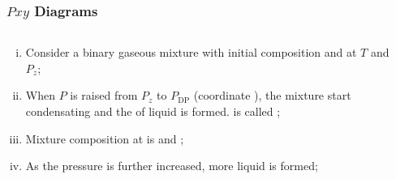 \documentclass[10pt,compress,unknownkeysallowed]{beamer}
\begin{document}
\begin{frame}
  \frametitle{$Pxy$ Diagrams}
  \begin{columns}
     \begin{column}[l]{0.5\linewidth}
       \begin{enumerate}[i)]
          \item<1-> Consider a binary gaseous mixture with initial composition \red{$\left[x_{1}=0; y_{1}=y_{z}\right]$} and \blue{$\left[x_{2}=0; y_{2}=1-y_{1}\right]$} at $T$ and $P_{z}$;
          \item<2-> When $P$ is raised from $P_{z}$ to $P_{\text{DP}}$ (coordinate ), the mixture start condensating and the  of liquid is formed.  is called {\bf {}};
          \item<3-> Mixture composition at  is \red{$\left[x_{1}=x_{\text{DP}}; y_{1}=y_{z}\right]$} and \blue{$\left[x_{2}=1-x_{1}; y_{2}=1-y_{1}\right]$};
          \item<4-> As the pressure is further increased, more liquid is formed;
       \end{enumerate}
     \end{column}
     \begin{column}[l]{0.5\linewidth} 
     \end{column}
  \end{columns}
\end{frame}
\normalsize
\end{document}

